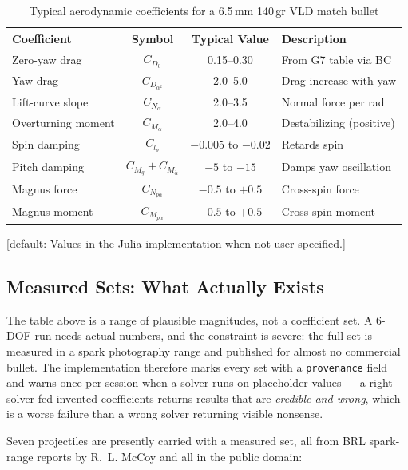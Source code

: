 \documentclass[11pt,twoside,openright]{report}
\newcommand{\default}[1]{\;\textrm{\textcolor{blue!60!black}{[default: #1]}}}
\begin{document}
\begin{table}[H]
\centering
\caption{Typical aerodynamic coefficients for a 6.5\,mm 140\,gr VLD match bullet}
\label{tab:aero_coeffs}
\begin{tabular}{@{}lccl@{}}
\toprule
\textbf{Coefficient} & \textbf{Symbol} & \textbf{Typical Value} & \textbf{Description} \\
\midrule
Zero-yaw drag & $C_{D_0}$ & 0.15--0.30 & From G7 table via BC \\
Yaw drag & $C_{D_{\alpha^2}}$ & 2.0--5.0 & Drag increase with yaw \\
Lift-curve slope & $C_{N_\alpha}$ & 2.0--3.5 & Normal force per rad \\
Overturning moment & $C_{M_\alpha}$ & 2.0--4.0 & Destabilizing (positive) \\
Spin damping & $C_{l_p}$ & $-0.005$ to $-0.02$ & Retards spin \\
Pitch damping & $C_{M_q}+C_{M_{\dot\alpha}}$ & $-5$ to $-15$ & Damps yaw oscillation \\
Magnus force & $C_{N_{p\alpha}}$ & $-0.5$ to $+0.5$ & Cross-spin force \\
Magnus moment & $C_{M_{p\alpha}}$ & $-0.5$ to $+0.5$ & Cross-spin moment \\
\bottomrule
\end{tabular}
\end{table}

\default{Values in the Julia implementation when not user-specified.}

\subsection{Measured Sets: What Actually Exists}

The table above is a range of plausible magnitudes, not a coefficient set. A 6-DOF
run needs actual numbers, and the constraint is severe: the full set is measured in
a spark photography range and published for almost no commercial bullet. The
implementation therefore marks every set with a \texttt{provenance} field and warns
once per session when a solver runs on placeholder values --- a right solver fed
invented coefficients returns results that are \emph{credible and wrong}, which is a
worse failure than a wrong solver returning visible nonsense.

Seven projectiles are presently carried with a measured set, all from BRL spark-range
reports by R.~L. McCoy and all in the public domain:
\end{document}
